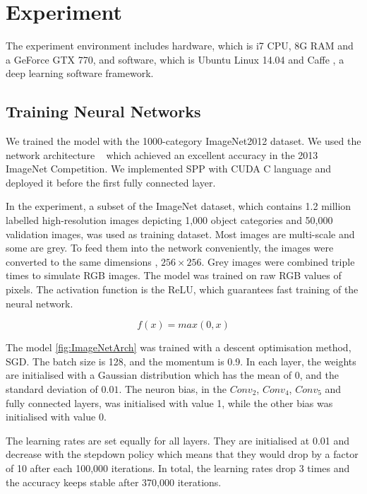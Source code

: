 
\chapter{Experiment} %
\label{Chapter4}

The experiment environment includes hardware, which is i7 CPU, 8G RAM and a GeForce GTX 770, and software, which is Ubuntu Linux 14.04 and Caffe \citep{jia2014caffe}, a deep learning software framework.

\section{Training Neural Networks}

We trained the model with the 1000-category ImageNet2012 dataset. We used the network architecture ~\cite{ZeilerF13} which achieved an excellent accuracy in the 2013 ImageNet Competition. We implemented SPP with CUDA C language and deployed it before the first fully connected layer.

In the experiment, a subset of the ImageNet dataset, which contains 1.2 million labelled high-resolution images depicting 1,000 object categories and 50,000 validation images, was used as training dataset. Most images are multi-scale and some are grey. To feed them into the network conveniently, the images were converted to the same dimensions , $256\times256$. Grey images were combined triple times to simulate RGB images. The model was trained on raw RGB values of pixels. The activation function is the ReLU, which guarantees fast training of the neural network.

\begin{equation}\label{eq:ReLU}
f(x) = max(0, x)
\end{equation}

The model \ref{fig:ImageNetArch} was trained with a descent optimisation method, SGD. The batch size is 128, and the momentum is 0.9.  In each layer, the weights are initialised with a Gaussian distribution which has the mean of $0$, and the standard deviation of $0.01$. The neuron bias, in the $Conv_{2}$, $Conv_{4}$, $Conv_{5}$ and fully connected layers, was initialised with value 1, while the other bias was initialised with value 0.

The learning rates are set equally for all layers. They are initialised at 0.01 and decrease with the stepdown policy which means that they would drop by a factor of 10 after each 100,000 iterations. In total, the learning rates drop 3 times and the accuracy keeps stable after 370,000 iterations. 

